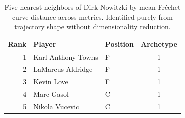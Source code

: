 \begin{table}[htbp]
  \centering\small
  \begin{tabular}{rllc}
    \toprule
    Rank & Player & Position & Archetype \\
    \midrule
    1 & Karl-Anthony Towns & F & 1 \\
    2 & LaMarcus Aldridge & F & 1 \\
    3 & Kevin Love & F & 1 \\
    4 & Marc Gasol & C & 1 \\
    5 & Nikola Vucevic & C & 1 \\
    \bottomrule
  \end{tabular}
  \caption{Five nearest neighbors of Dirk Nowitzki by mean Fr\'{e}chet curve distance across metrics. Identified purely from trajectory shape without dimensionality reduction.}
  \label{tab:Dirk_Nowitzki_frechet_curve_neighbors}
\end{table}

